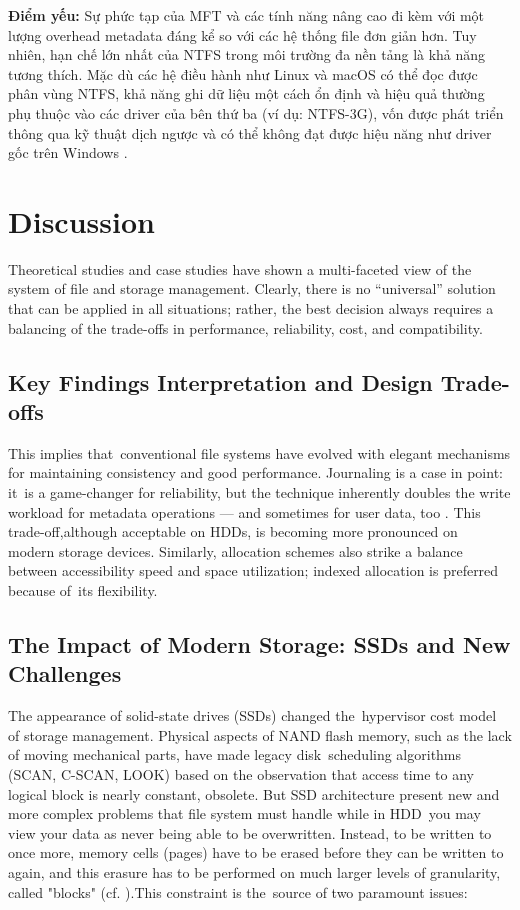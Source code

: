 \documentclass[12pt]{article}
\begin{document}
\textbf{Điểm yếu:} Sự phức tạp của MFT và các tính năng nâng cao đi kèm với một lượng overhead metadata đáng kể so với các hệ thống file đơn giản hơn. Tuy nhiên, hạn chế lớn nhất của NTFS trong môi trường đa nền tảng là khả năng tương thích. Mặc dù các hệ điều hành như Linux và macOS có thể đọc được phân vùng NTFS, khả năng ghi dữ liệu một cách ổn định và hiệu quả thường phụ thuộc vào các driver của bên thứ ba (ví dụ: NTFS-3G), vốn được phát triển thông qua kỹ thuật dịch ngược và có thể không đạt được hiệu năng như driver gốc trên Windows \parencite{Dhjaku2019}.



\section{Discussion}
Theoretical studies and case studies have shown a multi-faceted view of the system of file and storage management. Clearly, there is no “universal” solution that can be applied in all situations; rather, the best decision always requires a balancing of the trade-offs in performance, reliability, cost, and compatibility.

\subsection{Key Findings Interpretation and Design Trade-offs}
This implies that conventional file systems have evolved with elegant mechanisms for maintaining consistency and good performance. Journaling is a case in point: it is a game-changer for reliability, but the technique inherently doubles the write workload for metadata operations — and sometimes for user data, too \parencite{Lu2013Extending}. This trade-off,although acceptable on HDDs, is becoming more pronounced on   modern storage devices. Similarly, allocation schemes also strike a balance between accessibility speed and space utilization; indexed allocation is preferred because of its flexibility.

\subsection{The Impact of Modern Storage: SSDs and New Challenges}
The appearance of solid-state drives (SSDs) changed the hypervisor cost model of storage management. Physical aspects of NAND flash memory, such as the lack of moving mechanical parts, have made legacy disk scheduling algorithms (SCAN, C-SCAN, LOOK) based on the observation that access time to any logical block is nearly constant, obsolete.
But SSD architecture present new and more complex problems that file system must handle while in HDD you may view your data as never being able to be overwritten. Instead, to be written to once more, memory cells (pages) have to be erased before they can be written to again, and this erasure has to be performed on much larger levels of granularity, called "blocks" (cf. \parencite{Viking2017AN0035, Lu2013Extending}).This constraint is the source of two paramount issues:
\end{document}
